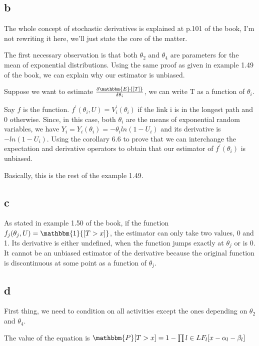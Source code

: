 \documentclass[12pt]{report}
\begin{document}
\subsection*{b}

The whole concept of stochastic derivatives is explained at p.101 of the book, I'm not rewriting it here, we'll just state the core of the matter.

The first necessary observation is that both $\theta_2$ and $\theta_4$ are parameters for the mean of exponential distributions. Using the same proof as given in example 1.49 of the book, we can explain why our estimator is unbiased.

Suppose we want to estimate $\frac{\delta\mathbbm{E}{[T]}}{\delta \theta_i}$, we can write T as a function of $\theta_i$. 

Say $f$ is the function. $f^{'}(\theta_i, U) = V^{'}_i(\theta_i)$ if the link i is in the longest path and 0 otherwise.
Since, in this case, both $\theta_i$ are the means of exponential random variables, we have $Y_i = Y_i(\theta_i) = -\theta_i ln(1 - U_i)$ and its derivative is $-ln(1-U_i)$. Using the corollary 6.6 to prove that we can interchange the expectation and derivative operators to obtain that our estimator of $f^{'}(\theta_i)$ is unbiased.

Basically, this is the rest of the example 1.49.

\subsection*{c}
As stated in example 1.50 of the book, if the function $f_j(\theta_j, U) = \mathbbm{1}{[T > x]}$, the estimator can only take
two values, 0 and 1. Its derivative is either undefined, when the
function jumps exactly at $\theta_j$ or is 0. It cannot be an unbiased estimator of the derivative because the original function is discontinuous at some point as a function of $\theta_j$.

\subsection*{d}
First thing, we need to condition on all activities except the ones depending on $\theta_2$ and $\theta_4$.



The value of the equation is $\mathbbm{P}[T>x] = 1 - \prod \limits{l \in L} F_l[x - \alpha_l - \beta_l]$
\end{document}
